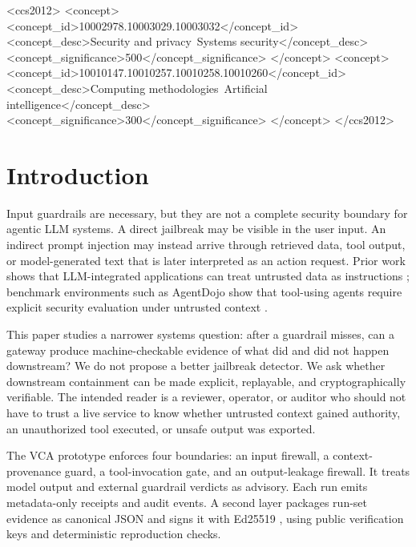 \documentclass[sigconf,anonymous,review]{acmart}
\newcommand{\system}{VCA prototype}
\begin{document}
\begin{CCSXML}
<ccs2012>
  <concept>
    <concept_id>10002978.10003029.10003032</concept_id>
    <concept_desc>Security and privacy~Systems security</concept_desc>
    <concept_significance>500</concept_significance>
  </concept>
  <concept>
    <concept_id>10010147.10010257.10010258.10010260</concept_id>
    <concept_desc>Computing methodologies~Artificial intelligence</concept_desc>
    <concept_significance>300</concept_significance>
  </concept>
</ccs2012>
\end{CCSXML}


\maketitle

\section{Introduction}

Input guardrails are necessary, but they are not a complete security boundary for agentic LLM systems. A direct jailbreak may be visible in the user input. An indirect prompt injection may instead arrive through retrieved data, tool output, or model-generated text that is later interpreted as an action request. Prior work shows that LLM-integrated applications can treat untrusted data as instructions \cite{greshake2023indirect}; benchmark environments such as AgentDojo show that tool-using agents require explicit security evaluation under untrusted context \cite{debenedetti2024agentdojo}.

This paper studies a narrower systems question: after a guardrail misses, can a gateway produce machine-checkable evidence of what did and did not happen downstream? We do not propose a better jailbreak detector. We ask whether downstream containment can be made explicit, replayable, and cryptographically verifiable. The intended reader is a reviewer, operator, or auditor who should not have to trust a live service to know whether untrusted context gained authority, an unauthorized tool executed, or unsafe output was exported.

The \system{} enforces four boundaries: an input firewall, a context-provenance guard, a tool-invocation gate, and an output-leakage firewall. It treats model output and external guardrail verdicts as advisory. Each run emits metadata-only receipts and audit events. A second layer packages run-set evidence as canonical JSON and signs it with Ed25519 \cite{rfc8785,rfc8032}, using public verification keys and deterministic reproduction checks.
\end{document}
